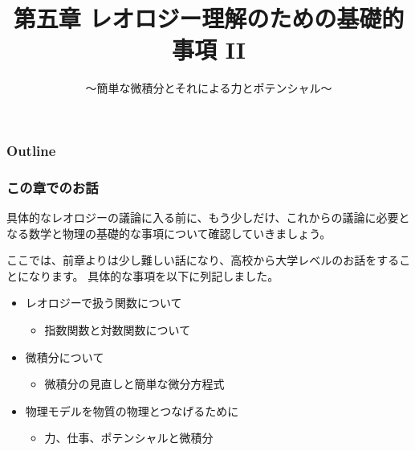 \documentclass[unicode,12pt,aspectratio=169]{beamer}
\title{第五章 レオロジー理解のための基礎的事項 II}
\subtitle{～簡単な微積分とそれによる力とポテンシャル～}
\date{}
\begin{document}
\maketitle

\begin{frame}
\frametitle{Outline}
\tableofcontents
\end{frame}

\begin{frame}
	\frametitle{この章でのお話}
	具体的なレオロジーの議論に入る前に、もう少しだけ、これからの議論に必要となる数学と物理の基礎的な事項について確認していきましょう。
	
	ここでは、前章よりは少し難しい話になり、高校から大学レベルのお話をすることになります。
	具体的な事項を以下に列記しました。
	\begin{itemize}
		\item レオロジーで扱う関数について
		\begin{itemize}
			\item 指数関数と対数関数について
		\end{itemize} 
		\item 微積分について
		\begin{itemize}
			\item 微積分の見直しと簡単な微分方程式
		\end{itemize} 
		\item 物理モデルを物質の物理とつなげるために
		\begin{itemize}
			\item 力、仕事、ポテンシャルと微積分
		\end{itemize} 
	\end{itemize}
\end{frame}

	
\end{document}

